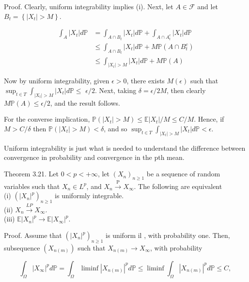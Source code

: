 \documentclass[11pt]{amsbook}
\theoremstyle{plain}%
\theoremstyle{definition}
\theoremstyle{remark}
\begin{document}
Proof. Clearly, uniform integrability implies (i). Next, let $A \in \mathcal{F}$ and let $B_{t}=\left\{\left|X_{t}\right|>M\right\}$.

$$
\begin{aligned}
\int_{A}\left|X_{t}\right| d \mathbb{P} & =\int_{A \cap B_{t}}\left|X_{t}\right| d \mathbb{P}+\int_{A \cap A_{t}^{c}}\left|X_{t}\right| d \mathbb{P} \\
& \leq \int_{A \cap B_{t}}\left|X_{t}\right| d \mathbb{P}+M \mathbb{P}\left(A \cap B_{t}^{c}\right) \\
& \leq \int_{\left|X_{t}\right|>M}\left|X_{t}\right| d \mathbb{P}+M \mathbb{P}(A)
\end{aligned}
$$

Now by uniform integrability, given $\epsilon>0$, there exists $M(\epsilon)$ such that $\sup _{t \in T} \int_{\left|X_{t}\right|>M}\left|X_{t}\right| d \mathbb{P} \leq$ $\epsilon / 2$. Next, taking $\delta=\epsilon / 2 M$, then clearly $M \mathbb{P}(A) \leq \epsilon / 2$, and the result follows.

For the converse implication, $\mathbb{P}\left(\left|X_{t}\right|>M\right) \leq \mathbb{E}\left|X_{t}\right| / M \leq C / M$. Hence, if $M>C / \delta$ then $\mathbb{P}\left(\left|X_{t}\right|>M\right)<\delta$, and so $\sup _{t \in T} \int_{\left|X_{t}\right|>M}\left|X_{t}\right| d \mathbb{P}<\epsilon$.

Uniform integrability is just what is needed to understand the difference between convergence in probability and convergence in the pth mean.

Theorem 3.21. Let $0<p<+\infty$, let $\left(X_{n}\right)_{n \geq 1}$ be a sequence of random variables such that $X_{n} \in L^{p}$, and $X_{n} \xrightarrow{\mathrm{P}} X_{\infty}$. The following are equivalent\\
(i) $\left(\left|X_{n}\right|^{p}\right)_{n \geq 1}$ is uniformly integrable.\\
(ii) $X_{n} \xrightarrow{L P} X_{\infty}$.\\
(iii) $\mathbb{E}\left|X_{n}\right|^{p} \rightarrow \mathbb{E}\left|X_{\infty}\right|^{p}$.

Proof. Assume that $\left(\left|X_{n}\right|^{p}\right)_{n \geq 1}$ is uniform il , with probability one. Then,\\
subsequence $\left(X_{n(m)}\right)$ such that $X_{n(m)} \rightarrow X_{\infty}$, with probability

$$
\int_{\Omega}\left|X_{\infty}\right|^{p} d \mathbb{P}=\int_{\Omega} \liminf \left|X_{n(m)}\right|^{p} d \mathbb{P} \leq \liminf \int_{\Omega}\left|X_{n(m)}\right|^{p} d \mathbb{P} \leq C \text {, }
$$
\end{document}
